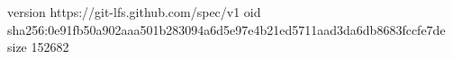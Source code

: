 version https://git-lfs.github.com/spec/v1
oid sha256:0e91fb50a902aaa501b283094a6d5e97e4b21ed5711aad3da6db8683fccfe7de
size 152682
